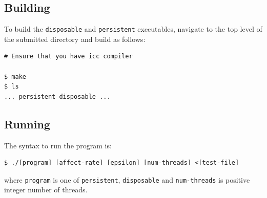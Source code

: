 \documentclass{article}
\begin{document}
\subsection*{Building}
\label{subsec:building}

To build the \texttt{disposable} and \texttt{persistent} executables, navigate
to the top level of the submitted directory and build as follows:

\begin{lstlisting}[style=DOS]
# Ensure that you have icc compiler

$ make
$ ls
... persistent disposable ...
\end{lstlisting}

\subsection*{Running}
\label{subsec:running}

The syntax to run the program is:

\begin{lstlisting}[style=DOS]
$ ./[program] [affect-rate] [epsilon] [num-threads] <[test-file]
\end{lstlisting}
where \texttt{program} is one of \texttt{persistent}, \texttt{disposable}
and \texttt{num-threads} is positive integer number of threads.
\end{document}
